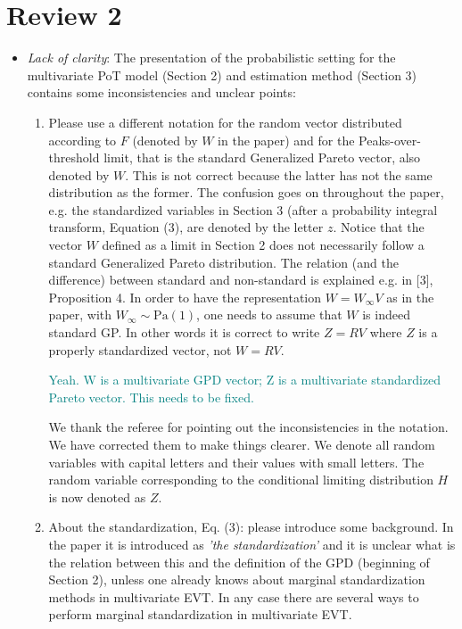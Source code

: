 \documentclass[10pt]{article}
\newcommand{\comment}[1]{\textcolor{teal}{#1}}
\begin{document}
\section*{Review 2}
\begin{itemize}
\item \emph{Lack of clarity}: The presentation of the probabilistic setting for the multivariate 
    PoT model (Section 2) and estimation method (Section 3) contains some inconsistencies and unclear
    points:
    \begin{enumerate}
    \item Please use a different notation for the random vector distributed according to $F$ 
        (denoted by $W$ in the paper) and for the Peaks-over-threshold limit, that is the standard
        Generalized Pareto vector, also denoted by $W$. This is not correct because the latter has 
        not the same distribution as the former. The confusion goes on throughout the paper, e.g. 
        the standardized variables in Section 3 (after a probability integral transform, Equation
        (3), are denoted by the letter $z$. Notice that the vector $W$ defined as a limit in Section 
        2 does not necessarily follow a standard Generalized Pareto distribution. The relation 
        (and the difference) between standard and non-standard is explained e.g. in [3], Proposition 4. 
        In order to have the representation $W = W_{\infty}V$ as in the paper, with 
        $W_{\infty} \sim \text{Pa}(1)$, one needs to assume that $W$ is indeed standard GP. In other 
        words it is correct to write $Z = RV$ where $Z$ is a properly standardized vector, not $W = RV$.

        \comment{Yeah.  W is a multivariate GPD vector; Z is a multivariate standardized Pareto vector.
        This needs to be fixed.}
        
        We thank the referee for pointing out the inconsistencies in the notation. We have corrected them 
        to make things clearer. We denote all random variables with capital letters and their values
        with small letters. The random variable corresponding to the conditional limiting distribution
        $H$ is now denoted as $Z$.

    \item About the standardization, Eq. (3): please introduce some background. In the paper it is
        introduced as \emph{’the standardization’} and it is unclear what is the relation between this 
        and the definition of the GPD (beginning of Section 2), unless one already knows about marginal
        standardization methods in multivariate EVT. In any case there are several ways to perform 
        marginal standardization in multivariate EVT.


\end{enumerate}
\end{itemize}
\end{document}
